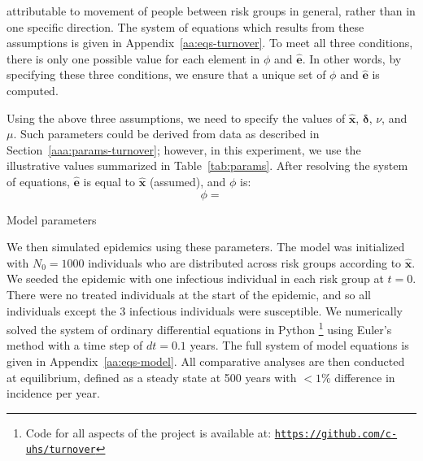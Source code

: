 attributable to movement of people between risk groups in general,
rather than in one specific direction.
The system of equations which results from these assumptions
is given in Appendix~\ref{aa:eqs-turnover}.
To meet all three conditions, there is only one possible value
for each element in $\phi$ and $\bm{\hat{e}}$.
In other words, by specifying these three conditions,
we ensure that a unique set of $\phi$ and $\bm{\hat{e}}$ is computed.
\par
Using the above three assumptions,
we need to specify the values of $\bm{\hat{x}}$, $\bm{\delta}$, $\nu$, and $\mu$.
Such parameters could be derived from data as described in Section~\ref{aaa:params-turnover};
however, in this experiment, we use the illustrative values summarized in
Table~\ref{tab:params}.
After resolving the system of equations,
$\bm{\hat{e}}$ is equal to $\bm{\hat{x}}$ (assumed), and $\phi$ is:
\begin{equation}
\label{eq:phi-values}
\phi = 
\end{equation}
\begin{table}
  \centering
  \caption{Model parameters}
  \label{tab:params}
  
\end{table}
\par
We then simulated epidemics using these parameters.
The model was initialized with $N_0 = 1000$ individuals
who are distributed across risk groups according to $\bm{\hat{x}}$.
We seeded the epidemic with
one infectious individual in each risk group at $t = 0$.
There were no treated individuals at the start of the epidemic,
and so all individuals except the 3 infectious individuals were susceptible.
We numerically solved the system of ordinary differential equations
in Python%
\footnote{Code for all aspects of the project is available at:
  \href{https://github.com/c-uhs/turnover}{\texttt{https://github.com/c-uhs/turnover}}}
using Euler's method with a time step of $dt = 0.1$ years.
The full system of model equations is given in Appendix~\ref{aa:eqs-model}.
All comparative analyses are then conducted at equilibrium,
defined as a steady state at 500 years with $<1\%$ difference in incidence per year.
